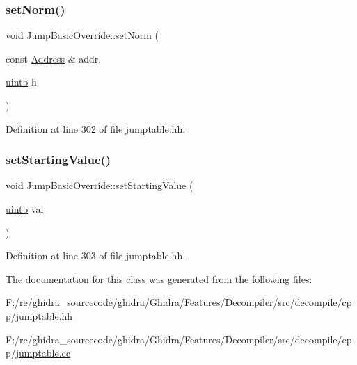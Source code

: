 \mbox{\label{class_jump_basic_override_ac3155afbfd9517e3e5653d56e6cd1d67}} 
\subsubsection{\texorpdfstring{setNorm()}{setNorm()}}
{\footnotesize\ttfamily void Jump\+Basic\+Override\+::set\+Norm (\begin{DoxyParamCaption}\item[{const \mbox{\hyperlink{class_address}{Address}} \&}]{addr,  }\item[{\mbox{\hyperlink{types_8h_a2db313c5d32a12b01d26ac9b3bca178f}{uintb}}}]{h }\end{DoxyParamCaption})\hspace{0.3cm}{\ttfamily [inline]}}



Definition at line 302 of file jumptable.\+hh.

\mbox{\label{class_jump_basic_override_a3ab3067a1835d692e3ac52b545ff2a7f}} 
\subsubsection{\texorpdfstring{setStartingValue()}{setStartingValue()}}
{\footnotesize\ttfamily void Jump\+Basic\+Override\+::set\+Starting\+Value (\begin{DoxyParamCaption}\item[{\mbox{\hyperlink{types_8h_a2db313c5d32a12b01d26ac9b3bca178f}{uintb}}}]{val }\end{DoxyParamCaption})\hspace{0.3cm}{\ttfamily [inline]}}



Definition at line 303 of file jumptable.\+hh.



The documentation for this class was generated from the following files\+:\begin{DoxyCompactItemize}
\item 
F\+:/re/ghidra\+\_\+sourcecode/ghidra/\+Ghidra/\+Features/\+Decompiler/src/decompile/cpp/\mbox{\hyperlink{jumptable_8hh}{jumptable.\+hh}}\item 
F\+:/re/ghidra\+\_\+sourcecode/ghidra/\+Ghidra/\+Features/\+Decompiler/src/decompile/cpp/\mbox{\hyperlink{jumptable_8cc}{jumptable.\+cc}}\end{DoxyCompactItemize}
